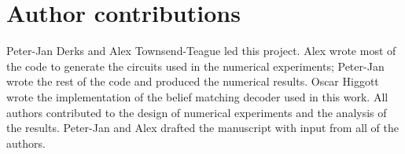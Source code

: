 \section{Author contributions}\label{sec:contributions}

Peter-Jan Derks and Alex Townsend-Teague led this project.
Alex wrote most of the code to generate the circuits used in the numerical experiments; Peter-Jan wrote the rest of the code and produced the numerical results.
Oscar Higgott wrote the implementation of the belief matching decoder used in this work.
All authors contributed to the design of numerical experiments and the analysis of the results.
Peter-Jan and Alex drafted the manuscript with input from all of the authors.